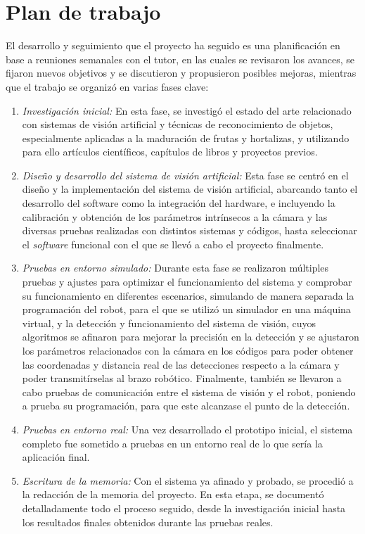 \section{Plan de trabajo}
\label{sec:plantrabajo}
El desarrollo y seguimiento que el proyecto ha seguido es una planificación en base a reuniones semanales con el tutor, en las cuales se revisaron los avances, se fijaron nuevos objetivos y se discutieron y propusieron posibles mejoras, mientras que el trabajo se organizó en varias fases clave: 
\begin{enumerate}
  \item \textit{Investigación inicial:} En esta fase, se investigó el estado del arte relacionado con sistemas de visión artificial y técnicas de reconocimiento de objetos, especialmente aplicadas a la maduración de frutas y hortalizas, y utilizando para ello artículos científicos, capítulos de libros y proyectos previos. 
  \item \textit{Diseño y desarrollo del sistema de visión artificial:} Esta fase se centró en el diseño y la implementación del sistema de visión artificial, abarcando tanto el desarrollo del software como la integración del hardware, e incluyendo la calibración y obtención de los parámetros intrínsecos a la cámara y las diversas pruebas realizadas con distintos sistemas y códigos, hasta seleccionar el \textit{software} funcional con el que se llevó a cabo el proyecto finalmente.
  \item \textit{Pruebas en entorno simulado:} Durante esta fase se realizaron múltiples pruebas y ajustes para optimizar el funcionamiento del sistema y comprobar su funcionamiento en diferentes escenarios, simulando de manera separada la programación del robot, para el que se utilizó un simulador en una máquina virtual, y la detección y funcionamiento del sistema de visión, cuyos algoritmos se afinaron para mejorar la precisión en la detección y se ajustaron los parámetros relacionados con la cámara en los códigos para poder obtener las coordenadas y distancia real de las detecciones respecto a la cámara y poder transmitírselas al brazo robótico. Finalmente, también se llevaron a cabo pruebas de comunicación entre el sistema de visión y el robot, poniendo a prueba su programación, para que este alcanzase el punto de la detección.
  \item \textit{Pruebas en entorno real:} Una vez desarrollado el prototipo inicial, el sistema completo fue sometido a pruebas en un entorno real de lo que sería la aplicación final. 
  \item \textit{Escritura de la memoria:} Con el sistema ya afinado y probado, se procedió a la redacción de la memoria del proyecto. En esta etapa, se documentó detalladamente todo el proceso seguido, desde la investigación inicial hasta los resultados finales obtenidos durante las pruebas reales. 
\end{enumerate}
